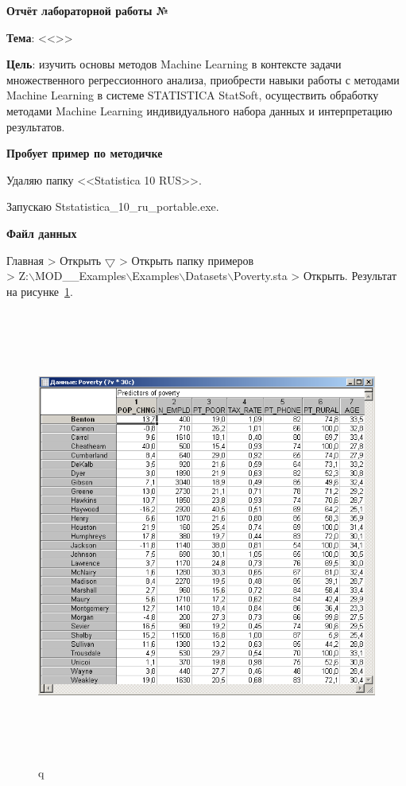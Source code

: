 \begin{center}
  \textbf{Отчёт лабораторной работы №\envReportLabNumber}
\end{center}

\textbf{Тема}:
<<\envReportTitle>>

\textbf{Цель}:
изучить основы методов Machine Learning в контексте задачи
множественного регрессионного анализа,
приобрести навыки работы с методами Machine Learning в системе STATISTICA StatSoft,
осуществить обработку методами Machine Learning индивидуального набора данных и интерпретацию результатов.

{}

\begin{center}
  \textbf{Пробует пример по методичке}
\end{center}

Удаляю папку <<Statistica 10 RUS>>.

Запускаю Ststatistica\_10\_ru\_portable.exe.

\begin{center}
  \textbf{Файл данных}
\end{center}

Главная > Открыть $\bigtriangledown$ > Открыть папку примеров\\
> Z:$\backslash$MOD\_\_Examples$\backslash$Examples$\backslash$Datasets$\backslash$Poverty.sta
> Открыть. Результат на рисунке~\ref{fig:example_1}.

\begin{figure}[!h]
  \centering

  \includegraphics[height=15cm]
  {inc/example_1.PNG}

  \caption{q}

  \label{fig:example_1}
\end{figure}

